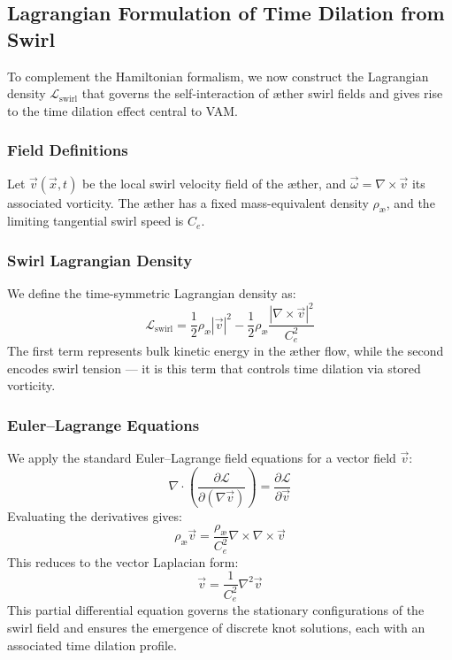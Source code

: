 \documentclass[12pt]{article}
\begin{document}
    \subsection{Lagrangian Formulation of Time Dilation from Swirl}
    \label{subsec:lagrangian_swirl}

    To complement the Hamiltonian formalism, we now construct the Lagrangian density \( \mathcal{L}_{\text{swirl}} \) that governs the self-interaction of æther swirl fields and gives rise to the time dilation effect central to VAM.

    \subsubsection*{Field Definitions}

    Let \( \vec{v}(\vec{x}, t) \) be the local swirl velocity field of the æther, and \( \vec{\omega} = \nabla \times \vec{v} \) its associated vorticity. The æther has a fixed mass-equivalent density \( \rho_\text{\ae} \), and the limiting tangential swirl speed is \( C_e \).

    \subsubsection*{Swirl Lagrangian Density}

    We define the time-symmetric Lagrangian density as:
    \begin{equation}
        \mathcal{L}_{\text{swirl}} = \frac{1}{2} \rho_\text{\ae} |\vec{v}|^2 - \frac{1}{2} \rho_\text{\ae} \frac{|\nabla \times \vec{v}|^2}{C_e^2}
    \end{equation}
    The first term represents bulk kinetic energy in the æther flow, while the second encodes swirl tension — it is this term that controls time dilation via stored vorticity.

    \subsubsection*{Euler–Lagrange Equations}

    We apply the standard Euler–Lagrange field equations for a vector field \( \vec{v} \):
    \begin{equation}
        \nabla \cdot \left( \frac{\partial \mathcal{L}}{\partial (\nabla \vec{v})} \right)
        = \frac{\partial \mathcal{L}}{\partial \vec{v}}
    \end{equation}
    Evaluating the derivatives gives:
    \begin{equation}
        \rho_\text{\ae} \vec{v} = \frac{\rho_\text{\ae}}{C_e^2} \nabla \times \nabla \times \vec{v}
    \end{equation}
    This reduces to the vector Laplacian form:
    \begin{equation}
        \boxed{
            \vec{v} = \frac{1}{C_e^2} \nabla^2 \vec{v}
        }
    \end{equation}
    This partial differential equation governs the stationary configurations of the swirl field and ensures the emergence of discrete knot solutions, each with an associated time dilation profile.
\end{document}
